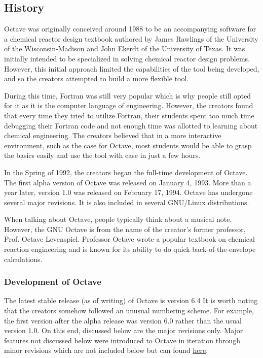 \documentclass{article}
\begin{document}
\subsection*{History}
\par
Octave was originally conceived around 1988 to be an accompanying software for a chemical reactor design textbook authored by James Rawlings of the University of the Wisconsin-Madison and John Ekerdt of the University of Texas. It was initially intended to be specialized in solving chemical reactor design problems. However, this initial approach limited the capabilities of the tool being developed, and so the creators attempted to build a more flexible tool.
\par
During this time, Fortran was still very popular which is why people still opted for it as it is the computer language of engineering. However, the creators found that every time they tried to utilize Fortran, their students spent too much time debugging their Fortran code and not enough time was allotted to learning about chemical engineering. The creators believed that in a more interactive environment, such as the case for Octave, most students would be able to grasp the basics easily and use the tool with ease in just a few hours.
\par
In the Spring of 1992, the creators began the full-time development of Octave. The first alpha version of Octave was released on January 4, 1993. More than a year later, version 1.0 was released on February 17, 1994. Octave has undergone several major revisions. It is also included in several GNU/Linux distributions.
\par
When talking about Octave, people typically think about a musical note. However, the GNU Octave is from the name of the creator’s former professor, Prof. Octave Levenspiel. Professor Octave wrote a popular textbook on chemical reaction engineering and is known for its ability to do quick back-of-the-envelope calculations.

\subsubsection*{Development of Octave}
\par
The latest stable release (as of writing) of Octave is version 6.4 It is worth noting that the creators somehow followed an unusual numbering scheme. For example, the first version after the alpha release was version 6.0 rather than the usual version 1.0. On this end, discussed below are the major revisions only. Major features not discussed below were introduced to Octave in iteration through minor revisions which are not included below but can found \href{https://wiki.octave.org/Release_History}{here}.
\end{document}
